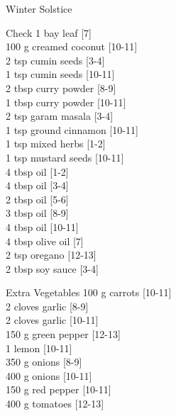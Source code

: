 \begin{menu}{Winter Solstice}
      \par\vfil %
      \vfil\clearpage %
      \begin{shoppinglist}{Check}
      1  bay leaf 
        {\scriptsize[7]}\\
      100 g creamed coconut 
        {\scriptsize[10-11]}\\
      2 tsp cumin seeds 
        {\scriptsize[3-4]}\\
      1 tsp cumin seeds 
        {\scriptsize[10-11]}\\
      2 tbsp curry powder 
        {\scriptsize[8-9]}\\
      1 tbsp curry powder 
        {\scriptsize[10-11]}\\
      2 tsp garam masala 
        {\scriptsize[3-4]}\\
      1 tsp ground cinnamon 
        {\scriptsize[10-11]}\\
      1 tsp mixed herbs 
        {\scriptsize[1-2]}\\
      1 tsp mustard seeds 
        {\scriptsize[10-11]}\\
      4 tbsp oil 
        {\scriptsize[1-2]}\\
      4 tbsp oil 
        {\scriptsize[3-4]}\\
      2 tbsp oil 
        {\scriptsize[5-6]}\\
      3 tbsp oil 
        {\scriptsize[8-9]}\\
      4 tbsp oil 
        {\scriptsize[10-11]}\\
      4 tbsp olive oil 
        {\scriptsize[7]}\\
      2 tsp oregano 
        {\scriptsize[12-13]}\\
      2 tbsp soy sauce 
        {\scriptsize[3-4]}\\
      \end{shoppinglist}%
      \begin{shoppinglist}{Extra Vegetables}
      100 g carrots 
        {\scriptsize[10-11]}\\
      2 cloves garlic 
        {\scriptsize[8-9]}\\
      2 cloves garlic 
        {\scriptsize[10-11]}\\
      150 g green pepper 
        {\scriptsize[12-13]}\\
      1  lemon 
        {\scriptsize[10-11]}\\
      350 g onions 
        {\scriptsize[8-9]}\\
      400 g onions 
        {\scriptsize[10-11]}\\
      150 g red pepper 
        {\scriptsize[10-11]}\\
      400 g tomatoes 
        {\scriptsize[12-13]}\\
      \end{shoppinglist}%
      \par\vfil %
    \vfil\clearpage
  

\end{menu}

